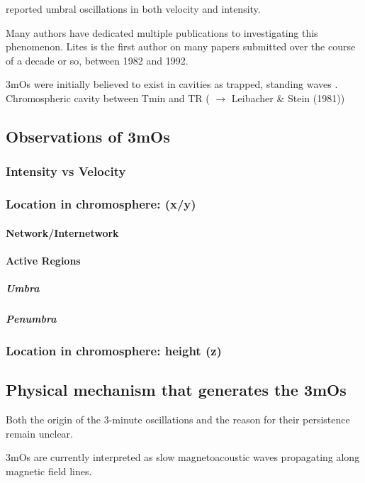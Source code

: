 \cite{Giovanelli1972} reported umbral oscillations in both velocity and intensity.

Many authors have dedicated multiple publications to investigating
this phenomenon. Lites is the first author on many papers submitted
over the course of a decade or so, between 1982 and 1992.


3mOs were initially believed to exist in cavities as
trapped, standing waves
\citep{Scheuer1981}.
Chromospheric cavity between Tmin and TR
(\cite{Chae2015}
$\rightarrow$
Leibacher \& Stein (1981))


\subsection{Observations of 3mOs}

\subsubsection{Intensity vs Velocity}
\subsubsection{Location in chromosphere: (x/y)}

\paragraph{Network/Internetwork}

\paragraph{Active Regions}
\subparagraph{Umbra}
\subparagraph{Penumbra}


\subsubsection{Location in chromosphere: height (z)}



\subsection{Physical mechanism that generates the 3mOs}

Both the origin of the 3-minute oscillations and the reason for their
persistence remain unclear.

3mOs are currently interpreted as slow
magnetoacoustic waves propagating along magnetic field lines.

